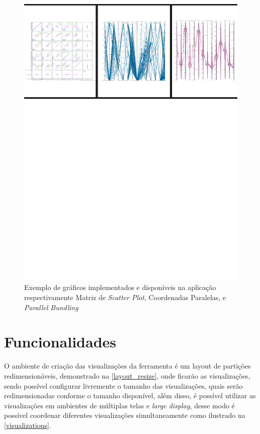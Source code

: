 \documentclass[
	12pt,				%
	openright,			%
	oneside,			%
	a4paper,			%
	english,			%
	brazil				%
	]{abntex2}
\begin{document}
    
 \begin{figure}[h]
	\caption{\label{graf_3} Exemplo de gráficos implementados e disponíveis na aplicação respectivamente Matriz de \textit{Scatter Plot}, Coordenadas Paralelas, e \textit{Parallel Bundling}}
	\begin{center}
	    \includegraphics[width=\textwidth,size=1, trim={0mm 180mm, 0mm 0mm},clip]{figures/garficos_3.pdf}
	\end{center}
\end{figure}
    


\section{Funcionalidades}

O ambiente de criação das visualizações da ferramenta é um layout de partições redimensionáveis, demonstrado na \autoref{layout_resize}, onde ficarão as visualizações, sendo possível configurar livremente o tamanho das visualizações, quais serão redimensionadas conforme o tamanho disponível, além disso, é possível utilizar as visualizações em ambientes de múltiplas telas e \textit{large display}, desse modo é  possível coordenar diferentes visualizações simultaneamente como ilustrado na \autoref{visualizations}.
\end{document}
